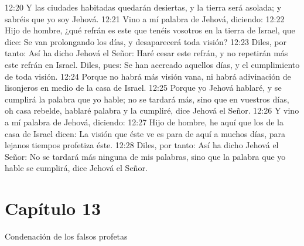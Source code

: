 12:20 Y las ciudades habitadas quedarán desiertas, y la tierra será asolada; y sabréis que yo soy Jehová.   
12:21 Vino a mí palabra de Jehová, diciendo:   
12:22 Hijo de hombre, ¿qué refrán es este que tenéis vosotros en la tierra de Israel, que dice: Se van prolongando los días, y desaparecerá toda visión?   
12:23 Diles, por tanto: Así ha dicho Jehová el Señor: Haré cesar este refrán, y no repetirán más este refrán en Israel. Diles, pues: Se han acercado aquellos días, y el cumplimiento de toda visión.   
12:24 Porque no habrá más visión vana, ni habrá adivinación de lisonjeros en medio de la casa de Israel.   
12:25 Porque yo Jehová hablaré, y se cumplirá la palabra que yo hable; no se tardará más, sino que en vuestros días, oh casa rebelde, hablaré palabra y la cumpliré, dice Jehová el Señor.   
12:26 Y vino a mí palabra de Jehová, diciendo:   
12:27 Hijo de hombre, he aquí que los de la casa de Israel dicen: La visión que éste ve es para de aquí a muchos días, para lejanos tiempos profetiza éste.   
12:28 Diles, por tanto: Así ha dicho Jehová el Señor: No se tardará más ninguna de mis palabras, sino que la palabra que yo hable se cumplirá, dice Jehová el Señor.   
\section*{Capítulo 13  }
Condenación de los falsos profetas   
  
